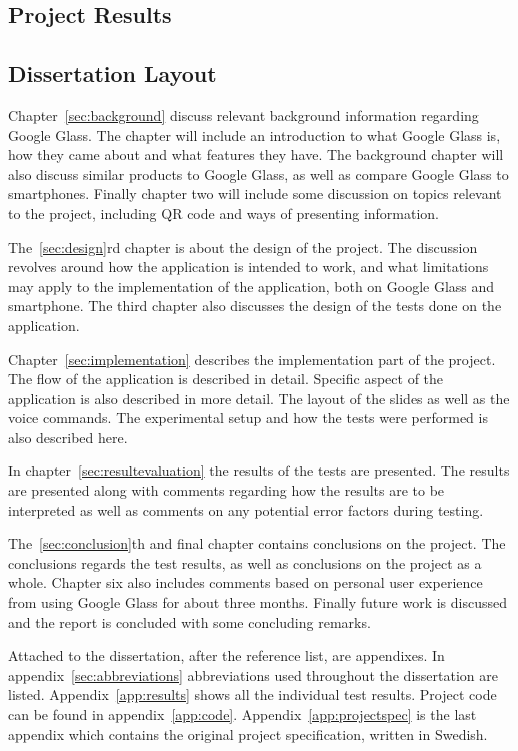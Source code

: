 \subsection{Project Results}


\subsection{Dissertation Layout}
Chapter~\ref{sec:background} discuss relevant background information regarding Google Glass. The chapter will include an introduction to what Google Glass is, how they came about and what features they have. The background chapter will also discuss similar products to Google Glass, as well as compare Google Glass to smartphones. Finally chapter two will include some discussion on topics relevant to the project, including QR code and ways of presenting information.

The~\ref{sec:design}rd chapter is about the design of the project. The discussion revolves around how the application is intended to work, and what limitations may apply to the implementation of the application, both on Google Glass and smartphone. The third chapter also discusses the design of the tests done on the application.

Chapter~\ref{sec:implementation} describes the implementation part of the project. The flow of the application is described in detail. Specific aspect of the application is also described in more detail. The layout of the slides as well as the voice commands. The experimental setup and how the tests were performed is also described here.

In chapter~\ref{sec:resultevaluation} the results of the tests are presented. The results are presented along with comments regarding how the results are to be interpreted as well as comments on any potential error factors during testing.

The~\ref{sec:conclusion}th and final chapter contains conclusions on the project. The conclusions regards the test results, as well as conclusions on the project as a whole. Chapter six also includes comments based on personal user experience from using Google Glass for about three months. Finally future work is discussed and the report is concluded with some concluding remarks.

Attached to the dissertation, after the reference list, are appendixes. In appendix~\ref{sec:abbreviations} abbreviations used throughout the dissertation are listed. Appendix~\ref{app:results} shows all the individual test results. Project code can be found in appendix~\ref{app:code}. Appendix~\ref{app:projectspec} is the last appendix which contains the original project specification, written in Swedish.
